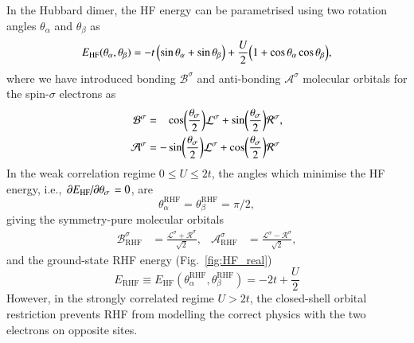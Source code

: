 \documentclass[aps,prb,reprint,noshowkeys,superscriptaddress]{revtex4-1}
\newcommand{\latin}[1]{#1}
\newcommand{\ie}{\latin{i.e.}}
\newcommand{\ta}{\theta_{\alpha}}
\newcommand{\tb}{\theta_{\beta}}
\newcommand{\Lsi}{\mathcal{L}^{\sigma}}
\newcommand{\Rsi}{\mathcal{R}^{\sigma}}
\begin{document}
In the Hubbard dimer, the HF energy can be parametrised using two rotation angles $\ta$ and $\tb$ as
\begin{equation}
E_\text{HF}(\ta, \tb) = -t\, \qty( \sin \ta + \sin \tb ) + \frac{U}{2} \qty( 1 + \cos \ta \cos \tb ),
\end{equation}
where we have introduced bonding $\mathcal{B}^{\sigma}$ and anti-bonding $\mathcal{A}^{\sigma}$ molecular orbitals for 
the spin-$\sigma$ electrons as
\begin{subequations}
\begin{align}
    \mathcal{B}^{\sigma} & = \hphantom{-} \cos(\frac{\theta_\sigma}{2}) \Lsi + \sin(\frac{\theta_\sigma}{2}) \Rsi,
	\\
	\mathcal{A}^{\sigma} & = - \sin(\frac{\theta_\sigma}{2}) \Lsi + \cos(\frac{\theta_\sigma}{2}) \Rsi
\end{align}
\label{eq:RHF_orbs}
\end{subequations}
In the weak correlation regime $0 \le U \le 2t$, the angles which minimise the HF energy, 
\ie, $\pdv*{E_\text{HF}}{\theta_\sigma} = 0$, are 
\begin{equation}
	\ta^\text{RHF} = \tb^\text{RHF} = \pi/2,
\end{equation}
giving the symmetry-pure molecular orbitals
\begin{align}
	\mathcal{B}_\text{RHF}^{\sigma} & = \frac{\Lsi + \Rsi}{\sqrt{2}},
	&
	\mathcal{A}_\text{RHF}^{\sigma} & = \frac{\Lsi - \Rsi}{\sqrt{2}},
\end{align}
and the ground-state RHF energy (Fig.~\ref{fig:HF_real})
\begin{equation}
	E_\text{RHF} \equiv E_\text{HF}(\ta^\text{RHF}, \tb^\text{RHF}) = -2t + \frac{U}{2}
\end{equation}
However, in the strongly correlated regime $U>2t$, the closed-shell orbital restriction prevents RHF from 
modelling the correct physics with the two electrons on opposite sites.
\end{document}
